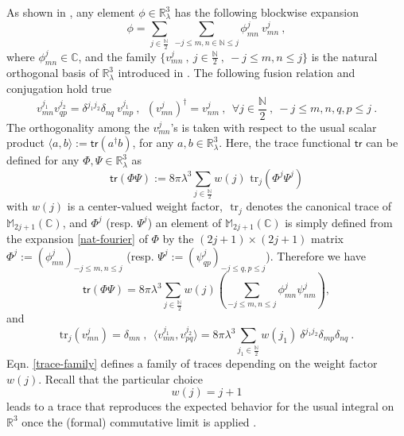 \documentclass[11pt]{book}
\newcommand{\tr}{\mathsf{tr}}
\theoremstyle{break}
\begin{document}
As shown in \cite{vitale_noncommutative_2013}, any element $\phi\in\mathbb{R}^3_\lambda$ has the following blockwise expansion%
%
\begin{equation}
\phi = \sum_{j\in\frac{\mathbb{N}}{2}} \ \sum_{-j\le m,n\in\mathbb{N}\le j} \phi^j_{mn} \ v^j_{mn} \ , \label{nat-fourier}
\end{equation}
%
where $\phi^j_{mn}\in\mathbb{C}$, and the family $\{v^j_{mn} \ , \ j\in\frac{\mathbb{N}}{2} \ ,\ -j\le m,n\le j\}$ is the natural orthogonal basis of $\mathbb{R}^3_\lambda$ introduced in \cite{vitale_noncommutative_2013}. The following fusion relation and conjugation hold true%
%
\begin{equation*}
v^{j_1}_{mn} v^{j_2}_{qp} = \delta^{j_1j_2} \delta_{nq} \ v^{j_1}_{mp} \ , \ \ (v^j_{mn})^\dag=v^j_{nm} \ , \ \ 
\forall j\in\frac{\mathbb{N}}{2} \ , \ -j\le m,n,q,p\le j \ . 
\end{equation*}
%
The orthogonality among the $v^j_{mn}$'s is taken with respect to the usual scalar product $\langle a,b\rangle:=\tr(a^\dag b)$, for any $a,b\in\mathbb{R}^3_\lambda$. Here, the trace functional $\tr$ can be defined \cite{gere_quantum_2014} for any $\Phi,\Psi\in\mathbb{R}^3_\lambda$ as%
%
\begin{equation}
\tr(\Phi\Psi) := 8 \pi \lambda^3 \sum_{j\in\frac{\mathbb{N}}{2}} w(j) \mbox{ tr}_j(\Phi^j\Psi^j)\label{trace-family}
\end{equation}
%
with $w(j)$ is a center-valued weight factor, $\mbox{ tr}_j$ denotes the canonical trace of $\mathbb{M}_{2j+1}(\mathbb{C})$, and $\Phi^j$ (resp. $\Psi^j$) an element of $\mathbb{M}_{2j+1}(\mathbb{C})$ is simply defined from the expansion \eqref{nat-fourier} of $\Phi$ by the $(2j+1)\times(2j+1)$ matrix $\Phi^j:=(\phi^j_{mn})_{-j\le m,n\le j}$ (resp. $\Psi^j:= (\psi^j_{qp})_{-j\le q,p\le j}$). Therefore we have%
%
\begin{equation*}
\tr(\Phi\Psi)  = 8 \pi \lambda^3 \sum_{j\in\frac{\mathbb{N}}{2}} w(j) \left( \sum_{-j\le m,n\le j}\phi^j_{mn}\psi^j_{nm}\right), 
\end{equation*}
%
and%
%
\begin{equation*}
\mbox{tr}_j(v^j_{mn}) = \delta_{mn} \ , \ \
\langle v^{j_1}_{mn} , v^{j_2}_{pq} \rangle = 8 \pi \lambda^3 \sum_{j_1\in\frac{\mathbb{N}}{2}} w(j_1) \ \delta^{j_1j_2} \delta_{mp} \delta_{nq} \ . 
\end{equation*}
%
Eqn. \eqref{trace-family} defines a family of traces depending on the weight factor $w(j)$. Recall that the particular choice%
\begin{equation}
w(j)=j+1\label{weight-gromov}
\end{equation}
%
leads to a trace that reproduces the expected behavior for the usual integral on $\mathbb{R}^3$ once the (formal) commutative limit is applied \cite{gere_quantum_2014}. 
\end{document}
